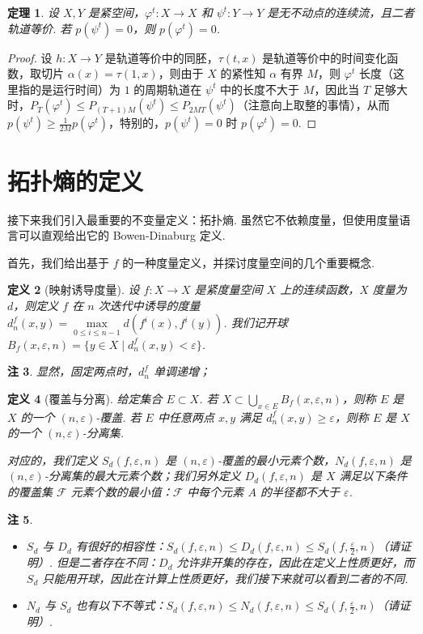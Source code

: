 \documentclass[11pt, a4paper, oneside]{ctexart}
\newtheorem{theorem}{定理}[section]
\newtheorem{definition}[theorem]{定义}
\newtheorem{remark}[theorem]{注}
\newcommand{\cF}{\mathcal{F}}
\begin{document}
    \begin{theorem}
        设 $X,Y$ 是紧空间，$\varphi^t:X\to X$ 和 $\psi^t:Y\to Y$ 是无不动点的连续流，且二者轨道等价. 若 $p(\psi^t)=0$，则 $p(\varphi^t)=0$.
    \end{theorem}
    \begin{proof}
        设 $h:X\to Y$ 是轨道等价中的同胚，$\tau(t,x)$ 是轨道等价中的时间变化函数，取切片 $\alpha(x)=\tau(1,x)$，则由于 $X$ 的紧性知 $\alpha$ 有界 $M$，则 $\varphi^t$ 长度（这里指的是运行时间）为 $1$ 的周期轨道在 $\psi^t$ 中的长度不大于 $M$，因此当 $T$ 足够大时，$P_T(\varphi^t)\leq P_{(T+1)M}(\psi^t)\leq P_{2MT}(\psi^t)$（注意向上取整的事情），从而 $p(\psi^t)\geq \frac{1}{2M}p(\varphi^t)$，特别的，$p(\psi^t)=0$ 时 $p(\varphi^t)=0$.
    \end{proof}

    \section{拓扑熵的定义}
    接下来我们引入最重要的不变量定义：拓扑熵. 虽然它不依赖度量，但使用度量语言可以直观给出它的 Bowen-Dinaburg 定义.

    首先，我们给出基于 $f$ 的一种度量定义，并探讨度量空间的几个重要概念.

    \begin{definition}[映射诱导度量]
        设 $f:X\to X$ 是紧度量空间 $X$ 上的连续函数，$X$ 度量为 $d$，则定义 $f$ 在 $n$ 次迭代中诱导的度量 $d_n^f(x,y)=\max\limits_{0\leq i\leq n-1}d(f^i(x),f^i(y))$. 我们记开球 $B_f(x,\varepsilon,n)=\{y\in X\mid d_n^f(x,y)<\varepsilon\}$.
    \end{definition}
    \begin{remark}
        显然，固定两点时，$d_n^f$ 单调递增；
    \end{remark}
    \begin{definition}[覆盖与分离]
        给定集合 $E\subset X$. 若 $X\subset \bigcup\limits_{x\in E}B_f(x,\varepsilon,n)$，则称 $E$ 是 $X$ 的一个 $(n,\varepsilon)$-覆盖. 若 $E$ 中任意两点 $x,y$ 满足 $d_n^f(x,y)\geq\varepsilon$，则称 $E$ 是 $X$ 的一个 $(n,\varepsilon)$-分离集.

        对应的，我们定义 $S_d(f,\varepsilon,n)$ 是 $(n,\varepsilon)$-覆盖的最小元素个数，$N_d(f,\varepsilon,n)$ 是 $(n,\varepsilon)$-分离集的最大元素个数；我们另外定义 $D_d(f,\varepsilon,n)$ 是 $X$ 满足以下条件的覆盖集 $\cF$ 元素个数的最小值：$\cF$ 中每个元素 $A$ 的半径都不大于 $\varepsilon$.
    \end{definition}
    \begin{remark}
        \begin{itemize}
            \item $S_d$ 与 $D_d$ 有很好的相容性：$S_d(f,\varepsilon,n)\leq D_d(f,\varepsilon,n)\leq S_d(f,\frac{\varepsilon}{2},n)$（请证明）. 但是二者存在不同：$D_d$ 允许非开集的存在，因此在定义上性质更好，而 $S_d$ 只能用开球，因此在计算上性质更好，我们接下来就可以看到二者的不同.
            \item $N_d$ 与 $S_d$ 也有以下不等式：$S_d(f,\varepsilon,n)\leq N_d(f,\varepsilon,n)\leq S_d(f,\frac{\varepsilon}{2},n)$（请证明）.
        \end{itemize}
    \end{remark}
\end{document}
